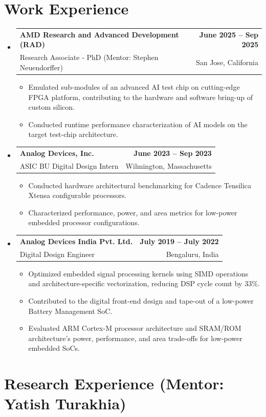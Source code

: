 \documentclass[letterpaper,11pt]{article}
\makeatletter
\newcommand{\resumeItem}[1]{
  \item{
    {#1 \vspace{-2pt}}
  }
}
\newcommand{\resumeSubheading}[4]{
  \vspace{-2pt}\item
    \begin{tabular*}{1.0\textwidth}[t]{l@{\extracolsep{\fill}}r}
      \textbf{#1} & \textbf{#2} \\
      #3 & #4 \\
    \end{tabular*}\vspace{-7pt}
}
\newcommand{\resumeSubHeadingListStart}{\begin{itemize}[leftmargin=0.0in, label={}]}
\newcommand{\resumeSubHeadingListEnd}{\end{itemize}}
\newcommand{\resumeItemListStart}{\begin{itemize}}
\newcommand{\resumeItemListEnd}{\end{itemize}\vspace{-5pt}}
\makeatother
\begin{document}
\section{Work Experience}
  \resumeSubHeadingListStart

      \resumeSubheading
      {AMD Research and Advanced Development (RAD)}{June 2025 -- Sep 2025}
      {Research Associate - PhD (Mentor: Stephen Neuendorffer)}{San Jose, California}
      \resumeItemListStart
        \resumeItem{Emulated sub-modules of an advanced AI test chip on cutting-edge FPGA platform, contributing to the hardware and software bring-up of custom silicon.}
        \resumeItem{Conducted runtime performance characterization of AI models on the target test-chip architecture.}
      \resumeItemListEnd

    \resumeSubheading
      {Analog Devices, Inc.}{June 2023 -- Sep 2023}
      {ASIC BU Digital Design Intern}{Wilmington, Massachusetts}
      \resumeItemListStart
        \resumeItem{Conducted hardware architectural benchmarking for Cadence Tensilica Xtensa configurable processors.}
        \resumeItem{Characterized performance, power, and area metrics for low-power embedded processor configurations.}

      \resumeItemListEnd
      
    \resumeSubheading
      {Analog Devices India Pvt. Ltd.}{July 2019 -- July 2022}
      {Digital Design Engineer}{Bengaluru, India}
      \resumeItemListStart
        \resumeItem{Optimized embedded signal processing kernels using SIMD operations and architecture-specific vectorization, reducing DSP cycle count by 33\%.}
        \resumeItem{Contributed to the digital front-end design and tape-out of a low-power Battery Management SoC.}
        \resumeItem{Evaluated ARM Cortex-M processor architecture and SRAM/ROM architecture's power, performance, and area trade-offs for low-power embedded SoCs.}
      \resumeItemListEnd

  \resumeSubHeadingListEnd
  
\section{Research Experience (Mentor: Yatish Turakhia)}
\end{document}
